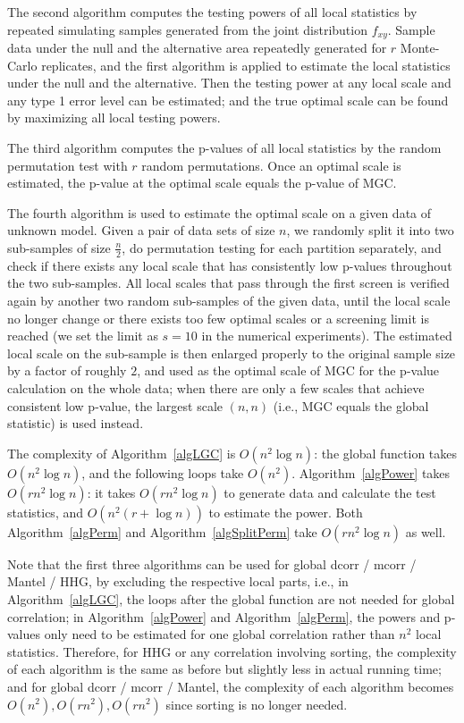 \documentclass[11pt]{article}
\begin{document}
The second algorithm computes the testing powers of all local statistics by repeated simulating samples generated from the joint distribution $f_{xy}$. Sample data under the null and the alternative area repeatedly generated for $r$ Monte-Carlo replicates, and the first algorithm is applied to estimate the local statistics under the null and the alternative. Then the testing power at any local scale and any type 1 error level can be estimated; and the true optimal scale can be found by maximizing all local testing powers.

The third algorithm computes the p-values of all local statistics by the random permutation test with $r$ random permutations. Once an optimal scale is estimated, the p-value at the optimal scale equals the p-value of MGC.

The fourth algorithm is used to estimate the optimal scale on a given data of unknown model. Given a pair of data sets of size $n$, we randomly split it into two sub-samples of size $\frac{n}{2}$, do permutation testing for each partition separately, and check if there exists any local scale that has consistently low p-values throughout the two sub-samples. All local scales that pass through the first screen is verified again by another two random sub-samples of the given data, until the local scale no longer change or there exists too few optimal scales or a screening limit is reached (we set the limit as $s=10$ in the numerical experiments). The estimated local scale on the sub-sample is then enlarged properly to the original sample size by a factor of roughly $2$, and used as the optimal scale of MGC for the p-value calculation on the whole data; when there are only a few scales that achieve consistent low p-value, the largest scale $(n,n)$ (i.e., MGC equals the global statistic) is used instead. 

The complexity of Algorithm~\ref{algLGC} is $O(n^2 \log n)$: the global function takes $O(n^2 \log n)$, and the following loops take $O(n^2)$. Algorithm~\ref{algPower} takes $O(rn^2 \log n)$: it takes $O(rn^2 \log n)$ to generate data and calculate the test statistics, and $O(n^2 (r+\log n))$ to estimate the power. Both Algorithm~\ref{algPerm} and Algorithm~\ref{algSplitPerm} take $O(rn^2 \log n)$ as well. 

Note that the first three algorithms can be used for global dcorr / mcorr / Mantel / HHG, by excluding the respective local parts, i.e., in Algorithm~\ref{algLGC}, the loops after the global function are not needed for global correlation; in Algorithm~\ref{algPower} and Algorithm~\ref{algPerm}, the powers and p-values only need to be estimated for one global correlation rather than $n^2$ local statistics. Therefore, for HHG or any correlation involving sorting, the complexity of each algorithm is the same as before but slightly less in actual running time; and for global dcorr / mcorr / Mantel, the complexity of each algorithm becomes $O(n^2), O(rn^2), O(rn^2)$ since sorting is no longer needed.
\end{document}
